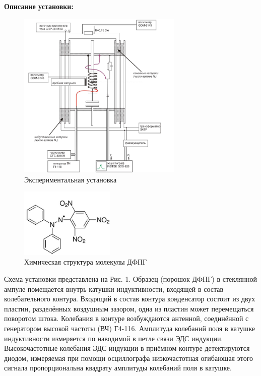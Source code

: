 \documentclass[a4paper, 12pt]{article}%
\begin{document}
	\newpage
	
	\textbf{Описание установки: }\\
	
	\begin{figure}[H]
		\begin{center}
			\includegraphics[width = 0.7\textwidth]{ust}
			\caption{Экспериментальная установка}
		\end{center}
	\end{figure}

	\begin{figure}[H]
		\begin{center}
			\includegraphics[width = 0.4\textwidth]{molecula}
			\caption{Химическая структура
				молекулы ДФПГ}
		\end{center}
	\end{figure}
	
	Схема установки представлена на Рис. 1. Образец (порошок ДФПГ) в стеклянной ампуле помещается внутрь катушки индуктивности, входящей в состав колебательного контура. Входящий в состав контура конденсатор состоит из двух пластин, разделённых воздушным зазором, одна из пластин может перемещаться поворотом штока. Колебания в контуре возбуждаются антенной, соединённой с генератором высокой частоты (ВЧ) Г4-116. Амплитуда колебаний поля в катушке индуктивности
	измеряется по наводимой в петле связи ЭДС индукции. Высокочастотные колебания ЭДС
	индукции в приёмном контуре детектируются диодом, измеряемая при помощи
	осциллографа низкочастотная огибающая этого сигнала пропорциональна квадрату
	амплитуды колебаний поля в катушке.\\
	
\end{document}
